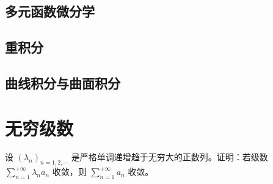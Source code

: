\documentclass[12pt]{article}
\newenvironment{problem}[2][Problem]{\begin{trivlist}
\item[\hskip \labelsep {\bfseries #1}\hskip \labelsep {\bfseries #2.}]}{\end{trivlist}}
\begin{document}
\subsection{多元函数微分学}


\subsection{重积分}


\subsection{曲线积分与曲面积分}


\section{无穷级数}

\begin{problem}{1}
设 $(\lambda_n)_{n=1,2,\cdots}$ 是严格单调递增趋于无穷大的正数列。证明：若级数 $\displaystyle{ \sum_{n=1}^{+\infty}}\lambda_n a_n$ 收敛，则 $\displaystyle{\sum_{n=1}^{+\infty}}a_n$ 收敛。
\end{problem}
\end{document}
